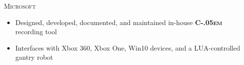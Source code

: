 \documentclass[11pt,letterpaper,roman]{moderncv} %
\newcommand{\csharp}{\textsc{\settoheight{\dimen0}{C}C\kern-.05em \resizebox{!}{\dimen0}{\raisebox{\depth}{\#}}}}
\begin{document}
  {\textsc{Microsoft}}{}{}{
 \begin{itemize}
   \item Designed, developed, documented, and maintained in-house \textbf{\csharp} recording tool
   \item Interfaces with Xbox 360, Xbox One, Win10 devices, and a LUA-controlled gantry robot
 \end{itemize}
 }



\end{document}
